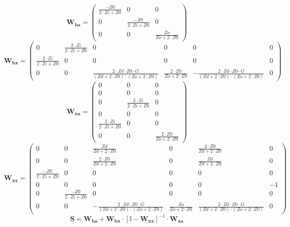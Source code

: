 \documentclass[10pt]{article} \usepackage{amsmath} \usepackage{bbold}
\begin{document}
\[ \mathbf{W_{ba}} = \left(\begin{smallmatrix} \frac{-Z0}{2\cdot Zi
+Z0} & 0 & 0 \\ 0 & \frac{-Z0}{2\cdot Zi +Z0} & 0 \\ 0 & 0 &
\frac{Zo}{Zo+2\cdot Z0} \end{smallmatrix}\right) \]
\[ \mathbf{W_{bx}} = \left(\begin{smallmatrix} 0 & \frac{2\cdot
Zi}{2\cdot Zi +Z0} & 0 & 0 & 0 & 0 \\ \frac{2\cdot Zi}{2\cdot Zi +Z0}
& 0 & 0 & 0 & 0 & 0 \\ 0 & 0 & \frac{2\cdot Zd\cdot Z0\cdot
G}{\left(Zd+2\cdot Z0\right)\cdot\left(Zo+2\cdot Z0\right)} &
\frac{2\cdot Z0}{Zo+2\cdot Z0} & -\frac{2\cdot Zd\cdot Z0\cdot
G}{\left(Zd+2\cdot Z0\right)\cdot\left(Zo+2\cdot Z0\right)} & 0
\end{smallmatrix}\right) \]
\[ \mathbf{W_{xa}} = \left(\begin{smallmatrix} 0 & 0 & 0 \\ 0 & 0 & 0
\\ 0 & \frac{2\cdot Zi}{2\cdot Zi +Z0} & 0 \\ 0 & 0 & 0 \\
\frac{2\cdot Zi}{2\cdot Zi +Z0} & 0 & 0 \\ 0 & 0 & \frac{2\cdot
Z0}{Zo+2\cdot Z0} \end{smallmatrix}\right) \]
\[ \mathbf{W_{xx}} = \left(\begin{smallmatrix} 0 & 0 &
\frac{Zd}{Zd+2\cdot Z0} & 0 & \frac{2\cdot Z0}{Zd+2\cdot Z0} & 0 \\ 0
& 0 & \frac{2\cdot Z0}{Zd+2\cdot Z0} & 0 & \frac{Zd}{Zd+2\cdot Z0} & 0
\\ \frac{-Z0}{2\cdot Zi +Z0} & 0 & 0 & 0 & 0 & 0 \\ 0 & 0 & 0 & 0 & 0
& -1 \\ 0 & \frac{-Z0}{2\cdot Zi +Z0} & 0 & 0 & 0 & 0 \\ 0 & 0 &
-\frac{2\cdot Zd\cdot Z0\cdot G}{\left(Zd+2\cdot
Z0\right)\cdot\left(Zo+2\cdot Z0\right)} & \frac{Zo}{Zo+2\cdot Z0} &
\frac{2\cdot Zd\cdot Z0\cdot G}{\left(Zd+2\cdot
Z0\right)\cdot\left(Zo+2\cdot Z0\right)} & 0 \end{smallmatrix}\right)
\]
\[ \mathbf{S}=\mathbf{W_{ba}}+\mathbf{W_{bx}}\cdot\left[ \mathbb{I}
-\mathbf{W_{xx}}\right]^{-1}\cdot\mathbf{W_{xa}} \]
\end{document}
